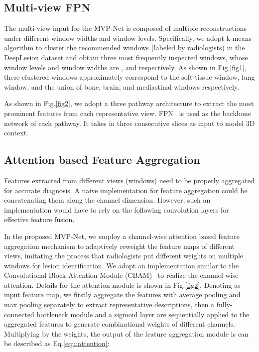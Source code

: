 \documentclass[runningheads]{llncs}
\begin{document}
\subsection{Multi-view FPN}

The multi-view input for the MVP-Net is composed of multiple reconstructions under different window widths and window levels. Specifically, we adopt k-means algorithm to cluster the recommended windows (labeled by radiologists) in the DeepLesion dataset and obtain three most frequently inspected windows, whose window levels and window widths are ,  and  respectively. As shown in Fig.\ref{fig1}, these clustered windows approximately correspond to the soft-tissue window, lung window, and the union of bone, brain, and mediastinal windows respectively.

As shown in Fig.\ref{fig2}, we adopt a three pathway architecture to extract the most prominent features from each representative view. FPN~\cite{FPN} is used as the backbone network of each pathway. It takes in three consecutive slices as input to model 3D context.

\subsection{Attention based Feature Aggregation}

Features extracted from different views (windows) need to be properly aggregated for accurate diagnosis. A naive implementation for feature aggregation could be concatenating them along the channel dimension. However, such an implementation would have to rely on the following convolution layers for effective feature fusion.



In the proposed MVP-Net, we employ a channel-wise attention based feature aggregation mechanism to adaptively reweight the feature maps of different views, imitating the process that radiologists put different weights on multiple windows for lesion identification. We adopt an implementation similar to the Convolutional Block Attention Module (CBAM)~\cite{CBAM} to realize the channel-wise attention. Details for the attention module is shown in Fig.\ref{fig2}. Denoting \bm{} as input feature map, we firstly aggregate the features with average pooling  and max pooling  separately to extract representative descriptions, then a fully-connected bottleneck module \bm{} and a sigmoid layer \bm{} are sequentially applied to the aggregated features to generate combinational weights of different channels. Multiplying \bm{} by the weights, the output \bm{} of the feature aggregation module is can be described as Eq.\ref{equ:attention}:
\end{document}
